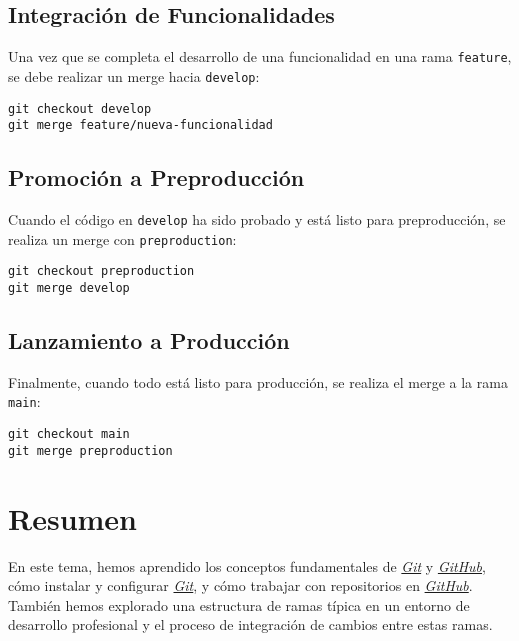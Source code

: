 \documentclass{template/uem_theme}
\begin{document}
\subsection{Integración de Funcionalidades}
Una vez que se completa el desarrollo de una funcionalidad en una rama \texttt{feature}, se debe realizar un merge hacia \texttt{develop}:
\begin{verbatim}
git checkout develop
git merge feature/nueva-funcionalidad
\end{verbatim}

\subsection{Promoción a Preproducción}
Cuando el código en \texttt{develop} ha sido probado y está listo para preproducción, se realiza un merge con \texttt{preproduction}:
\begin{verbatim}
git checkout preproduction
git merge develop
\end{verbatim}

\subsection{Lanzamiento a Producción}
Finalmente, cuando todo está listo para producción, se realiza el merge a la rama \texttt{main}:
\begin{verbatim}
git checkout main
git merge preproduction
\end{verbatim}

\newpage
\section*{Resumen}
\label{sec:resumen}

En este tema, hemos aprendido los conceptos fundamentales de \href{https://git-scm.com/}{\textit{Git}} y \href{https://github.com}{\textit{GitHub}}, cómo instalar y configurar \href{https://git-scm.com/}{\textit{Git}}, y cómo trabajar con repositorios en \href{https://github.com}{\textit{GitHub}}. También hemos explorado una estructura de ramas típica en un entorno de desarrollo profesional y el proceso de integración de cambios entre estas ramas.

\newpage
\printglossary[title=Acrónimos, type=\acronymtype]

\newpage
\uemBibliography
\end{document}
